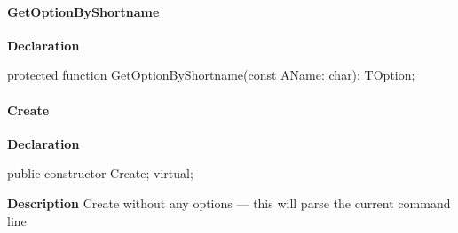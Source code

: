 \documentclass{report}
\newif\ifpdf
\begin{document}
\paragraph*{GetOptionByShortname}\hspace*{\fill}

\label{PasDoc_OptionParser.TOptionParser-GetOptionByShortname}
\begin{list}{}{
\setlength{\itemindent}{0cm}
\setlength{\listparindent}{0cm}
\setlength{\leftmargin}{\evensidemargin}
\addtolength{\leftmargin}{\tmplength}
\settowidth{\labelsep}{X}
\addtolength{\leftmargin}{\labelsep}
\setlength{\labelwidth}{\tmplength}
}
\item[\textbf{Declaration}\hfill]
\ifpdf
\begin{flushleft}
\fi
\begin{ttfamily}
protected function GetOptionByShortname(const AName: char): TOption;\end{ttfamily}

\ifpdf
\end{flushleft}
\fi

\end{list}
\paragraph*{Create}\hspace*{\fill}

\label{PasDoc_OptionParser.TOptionParser-Create}
\begin{list}{}{
\setlength{\itemindent}{0cm}
\setlength{\listparindent}{0cm}
\setlength{\leftmargin}{\evensidemargin}
\addtolength{\leftmargin}{\tmplength}
\settowidth{\labelsep}{X}
\addtolength{\leftmargin}{\labelsep}
\setlength{\labelwidth}{\tmplength}
}
\item[\textbf{Declaration}\hfill]
\ifpdf
\begin{flushleft}
\fi
\begin{ttfamily}
public constructor Create; virtual;\end{ttfamily}

\ifpdf
\end{flushleft}
\fi

\par
\item[\textbf{Description}]
Create without any options --- this will parse the current command line

\end{list}
\end{document}
